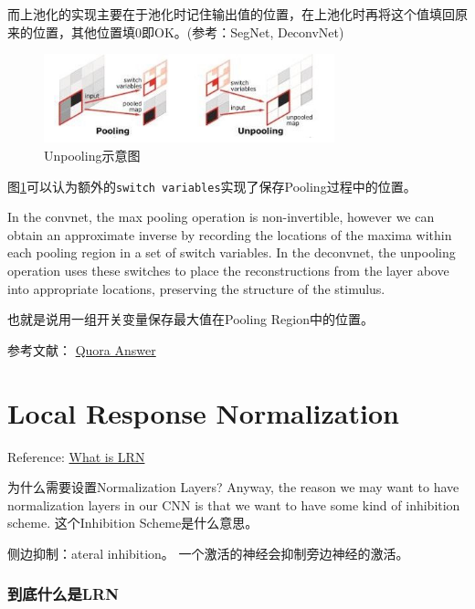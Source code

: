 而上池化的实现主要在于池化时记住输出值的位置，在上池化时再将这个值填回原来的位置，其他位置填0即OK。(参考：SegNet, DeconvNet)

\begin{figure}[!hbtp]
\centering
\includegraphics[width=0.75\textwidth]{DLTips/Unpooling0.png}
\caption{Unpooling示意图}
\label{Unpooling0}
\end{figure}

图\ref{Unpooling0}可以认为额外的\verb|switch variables|实现了保存Pooling过程中的位置。

In the convnet, the max pooling operation is non-invertible, however we can obtain an approximate inverse by recording the locations of the maxima within each pooling region in a set of switch variables. In the deconvnet, the unpooling operation uses these switches to place the reconstructions from the layer above into appropriate locations, preserving the structure of the stimulus.

也就是说用一组开关变量保存最大值在Pooling Region中的位置。

参考文献： \href{https://www.quora.com/What-is-the-difference-between-Deconvolution-Upsampling-Unpooling-and-Convolutional-Sparse-Coding}{Quora Answer}

\section{Local Response Normalization}

Reference: \href{https://prateekvjoshi.com/2016/04/05/what-is-local-response-normalization-in-convolutional-neural-networks/}{What is LRN}

为什么需要设置Normalization Layers?
Anyway, the reason we may want to have normalization layers in our CNN is that we want to have some kind of inhibition scheme. 这个Inhibition Scheme是什么意思。

侧边抑制：ateral inhibition。 一个激活的神经会抑制旁边神经的激活。

\subsubsection{到底什么是LRN}


